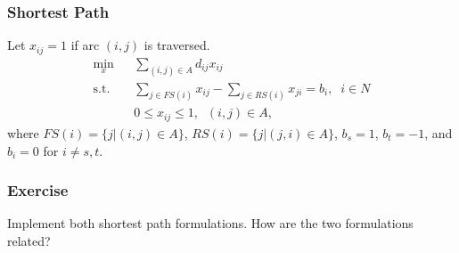 \documentclass[12pt,handout]{beamer}
\begin{document}
\begin{frame}
\frametitle{Shortest Path}
Let $x_{ij} = 1$ if arc $(i,j)$ is traversed.
\begin{eqnarray}
\min_x && \sum_{(i,j) \in A} d_{ij} x_{ij} \nonumber \\
\mbox{s.t.} && \sum_{j \in FS(i)} x_{ij} - \sum_{j \in RS(i)} x_{ji} = b_i,\;\;i \in N \nonumber \\
&& 0 \le x_{ij} \le 1,\;\;(i,j) \in A, \nonumber
\end{eqnarray}
\noindent where $FS(i) = \{j | (i,j) \in A\}$, $RS(i) = \{j | (j, i) \in A\}$, $b_s = 1$, $b_t = -1$, and $b_i = 0$ for $i \neq s, t$.
\end{frame}

\begin{frame}
\frametitle{Exercise}
Implement both shortest path formulations. How are the two formulations related?
\end{frame}
\end{document}
